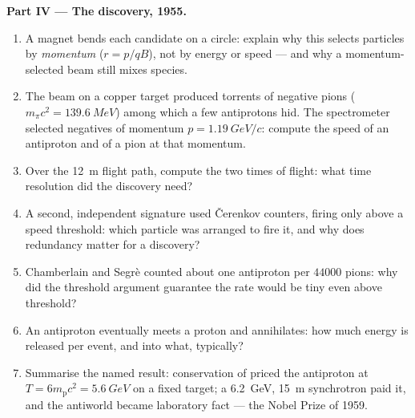 \begin{problem}
\medskip\noindent\textbf{Part IV --- The discovery, 1955.}
\begin{enumerate}[resume]
  \item A magnet bends each candidate on a circle: explain why this
        selects particles by \emph{momentum} ($r = p/qB$), not by
        energy or speed --- and why a momentum-selected beam still
        mixes species.
  \item The beam on a copper target produced torrents of negative
        pions ($m_\pi c^2 = \qty{139.6}{MeV}$) among which a few
        antiprotons hid. The spectrometer selected negatives of
        momentum $p = \qty{1.19}{GeV}/c$: compute the speed of an
        antiproton and of a pion at that momentum.
  \item Over the \qty{12}{m} flight path, compute the two times of
        flight: what time resolution did the discovery need?
  \item A second, independent signature used \v Cerenkov counters,
        firing only above a speed threshold: which particle was
        arranged to fire it, and why does redundancy matter for a
        discovery?
  \item Chamberlain and Segrè counted about one antiproton per
        $\num{44000}$ pions: why did the threshold argument
        guarantee the rate would be tiny even above threshold?
  \item An antiproton eventually meets a proton and annihilates:
        how much energy is released per event, and into what,
        typically?
  \item Summarise the named result: conservation of 
        priced the antiproton at $T = 6m_{\text{p}}c^2 =
        \qty{5.6}{GeV}$ on a fixed target; a \qty{6.2}{GeV},
        \qty{15}{m} synchrotron paid it, and the antiworld became
        laboratory fact --- the Nobel Prize of 1959.
\end{enumerate}
\end{problem}
